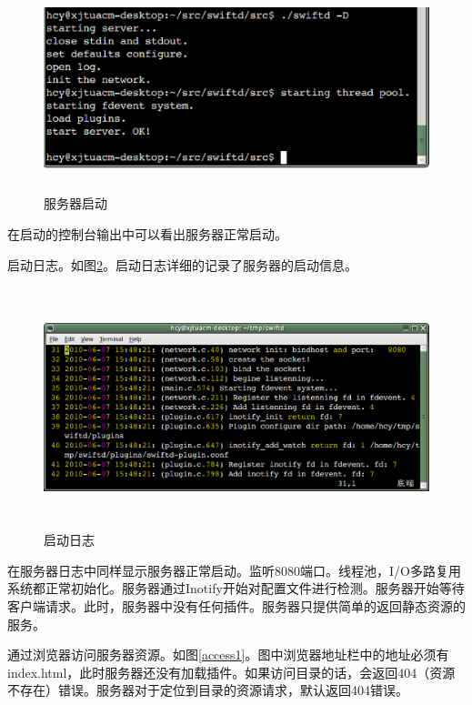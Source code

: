\documentclass[twoside, xetex]{report}
\begin{document}
	\begin{figure}[htbp]
	\centering
	\includegraphics[height=6cm, width=15cm]{pics/startup.eps}
	\caption{服务器启动}
	\label{startup}
	\end{figure}
	
	在启动的控制台输出中可以看出服务器正常启动。
	
	启动日志。如图\ref{startuplog}。启动日志详细的记录了服务器的启动信息。
	\begin{figure}[htbp]
	\centering
	\includegraphics[height=7cm, width=16cm]{pics/startuplog.eps}
	\caption{启动日志}
	\label{startuplog}
	\end{figure}
	
	在服务器日志中同样显示服务器正常启动。监听8080端口。线程池，I/O多路复用系统都正常初始化。服务器通过Inotify开始对配置文件进行检测。服务器开始等待客户端请求。此时，服务器中没有任何插件。服务器只提供简单的返回静态资源的服务。
	
	通过浏览器访问服务器资源。如图\ref{access1}。图中浏览器地址栏中的地址必须有index.html，此时服务器还没有加载插件。如果访问目录的话，会返回404（资源不存在）错误。服务器对于定位到目录的资源请求，默认返回404错误。
	
\end{document}
